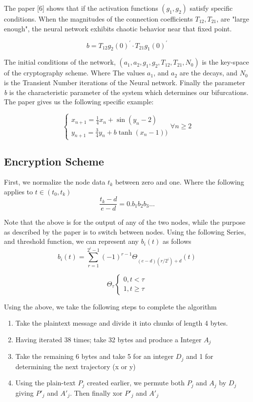 \documentclass[12pt, letterpaper]{article}
\begin{document}
The paper [6] shows that if the activation functions \((g_{1}, g_{2})\) satisfy specific conditions. When the magnitudes of the connection coefficients \(T_{12}, T_{21}\), are "large enough", the neural network exhibits chaotic behavior near that fixed point.

\begin{equation}\label{b defintion}
b = T_{12}g_{2}(0)^{'} \cdot T_{21}g_{1}(0)^{'}
\end{equation}

The initial conditions of the network, \((a_1, a_2, g_1, g_2, T_{12}, T_{21}, N_{0})\) is the key-space of the cryptography scheme. Where The values \(a_1\), and \(a_2\) are the decays, and \(N_{0}\) is the Transient Number iterations of the Neural network. Finally the parameter \textit{b} is the characteristic parameter of the system which determines our bifurcations. The paper gives us the following specific example:

\begin{equation}\label{hopfield network}
    \begin{cases}
    x_{n+1} = \frac{1}{4}x_{n} + \sin(y_{n} - 2)\\
    y_{n+1} = \frac{3}{4}y_{n} + b\tanh(x_{n} - 1))
    \end{cases} \forall n \geq 2
\end{equation}

\subsection*{Encryption Scheme}
First, we normalize the node data \(t_{k}\) between zero and one. Where the following applies to \(t \in (t_{0}, t_{k})\)
\[\frac{t_{k} - d}{e -d} = 0.b_{1}b_{2}b_{3}\dots\]

Note that the above is for the output of any of the two nodes, while the purpose as described by the paper is to switch between nodes.
Using the following Series, and threshold function, we can represent any \(b_{i}(t)\) as follows
\[b_{i}(t) = \sum_{r=1}^{2^{i} - 1}(-1)^{r-1}\Theta_{(e - d)(r/2^{i}) + d}(t)\]

\[\Theta_\tau
\begin{cases}
0, t < \tau \\
1, t \geq \tau
\end{cases}
\]

Using the above, we take the following steps to complete the algorithm
\begin{enumerate}
    \item Take the plaintext message and divide it into chunks of length 4 bytes.
    \item Having iterated 38 times; take 32 bytes and produce a Integer \(A_{j}\)
    \item Take the remaining 6 bytes and take 5 for an integer \(D_j\) and 1 for determining the next trajectory (x or y)
    \item Using the plain-text \(P_j\) created earlier, we permute both \(P_j\) and \(A_j\) by \(D_j\) giving \(P'_{j}\) and \(A'_{j}\). Then finally xor \(P'_j\) and \(A'_j\)
\end{enumerate}
\end{document}
